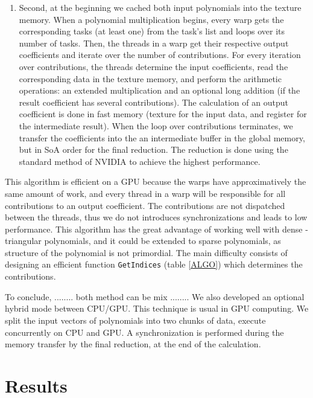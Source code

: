\documentclass[oribibl]{llncs2e/llncs}
\begin{document}
\begin{enumerate}
\item  Second, at the beginning we  cached both input polynomials into the texture memory. 
When a polynomial multiplication begins,  every warp gets the corresponding tasks (at least one) from the task's list and loops over its number of tasks. Then,
the threads in a warp get their respective output coefficients and iterate over the number of  contributions.
For every iteration over contributions, the threads determine the input coefficients, read the corresponding data in the texture memory, and perform the arithmetic operations: an extended multiplication and an optional long addition (if the result coefficient has several contributions). The calculation of an output coefficient  is  done in fast memory (texture for the input data, and register for the intermediate result). 
When the loop over contributions terminates,  we transfer the coefficients into the an intermediate buffer in the global memory, but in SoA  order for the final reduction. 
The reduction is done using the standard method of NVIDIA \cite{CUDAReduction} to achieve the highest performance.




\end{enumerate}


This algorithm is efficient on a GPU because the warps have approximatively the same amount of work,  and every thread in a warp will be responsible for all contributions to an output coefficient.
The contributions are not dispatched between the threads, thus we do not  introduces   synchronizations and leads to low performance. 
This  algorithm has the great advantage of working well with dense - triangular polynomials, and it could be extended to sparse polynomials, as structure of the polynomial is not primordial.
The main difficulty consists  of designing an efficient function \texttt{GetIndices} (table \ref{ALGO}) which determines the contributions.

To conclude, ........ both method can be mix ........ We also developed an optional hybrid mode between CPU/GPU. This  technique is usual in GPU computing.
We split the input vectors of polynomials into two chunks of data, execute concurrently on CPU and GPU. 
A synchronization  is performed during  the memory transfer   by the final reduction, at the end of the calculation.

\section{Results}
\end{document}
